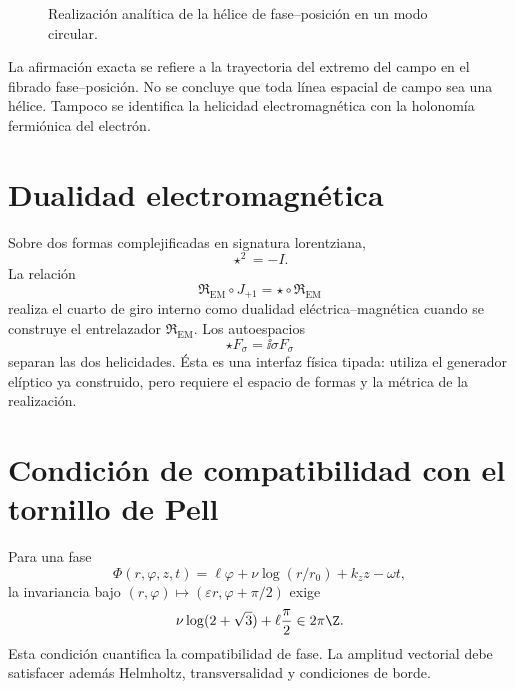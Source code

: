 \begin{figure}[htbp]
\centering
{}
\caption{Realización analítica de la hélice de fase--posición en un modo circular.}
\label{espiral:fig:helice-em}
\end{figure}

La afirmación exacta se refiere a la trayectoria del extremo del campo en el
fibrado fase--posición. No se concluye que toda línea espacial de campo sea
una hélice. Tampoco se identifica la helicidad electromagnética con la
holonomía fermiónica del electrón.

\section{Dualidad electromagnética}

Sobre dos formas complejificadas en signatura lorentziana,
\[
 \star^2=-I.
\]
La relación
\[
 \mathfrak R_{\mathrm{EM}}\circ J_{+1}
 =\star\circ\mathfrak R_{\mathrm{EM}}
\]
realiza el cuarto de giro interno como dualidad eléctrica--magnética cuando
se construye el entrelazador \(\mathfrak R_{\mathrm{EM}}\). Los autoespacios
\[
 \star F_\sigma=\ii\sigma F_\sigma
\]
separan las dos helicidades. Ésta es una interfaz física tipada: utiliza el
generador elíptico ya construido, pero requiere el espacio de formas y la
métrica de la realización.

\section{Condición de compatibilidad con el tornillo de Pell}

Para una fase
\[
 \Phi(r,\varphi,z,t)
 =\ell\varphi+\nu\log(r/r_0)+k_zz-\omega t,
\]
la invariancia bajo
\((r,\varphi)\mapsto(\varepsilon r,\varphi+\pi/2)\) exige
\begin{equation}
 \nu\log(2+\sqrt3)+\ell\frac\pi2
 \in2\pi\Z.
 \label{espiral:eq:cuantizacion-tornillo-em}
\end{equation}
Esta condición cuantifica la compatibilidad de fase. La amplitud vectorial
debe satisfacer además Helmholtz, transversalidad y condiciones de borde.
